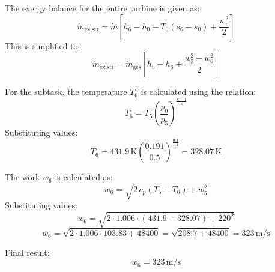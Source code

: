 The exergy balance for the entire turbine is given as:  
\[
\dot{m}_{\text{ex,str}} = \dot{m} \left[ h_6 - h_0 - T_0 (s_6 - s_0) + \frac{w_e^2}{2} \right]
\]  
This is simplified to:  
\[
\dot{m}_{\text{ex,str}} = \dot{m}_{\text{ges}} \left[ h_5 - h_6 + \frac{w_5^2 - w_6^2}{2} \right]
\]  

For the subtask, the temperature \( T_6 \) is calculated using the relation:  
\[
T_6 = T_5 \left( \frac{p_0}{p_5} \right)^{\frac{\kappa - 1}{\kappa}}
\]  
Substituting values:  
\[
T_6 = 431.9 \, \text{K} \left( \frac{0.191}{0.5} \right)^{\frac{0.4}{1.4}} = 328.07 \, \text{K}
\]  

The work \( w_6 \) is calculated as:  
\[
w_6 = \sqrt{2 \, c_p (T_5 - T_6) + w_5^2}
\]  
Substituting values:  
\[
w_6 = \sqrt{2 \cdot 1.006 \cdot (431.9 - 328.07) + 220^2}
\]  
\[
w_6 = \sqrt{2 \cdot 1.006 \cdot 103.83 + 48400} = \sqrt{208.7 + 48400} = 323 \, \text{m/s}
\]  

Final result:  
\[
w_6 = 323 \, \text{m/s}
\]